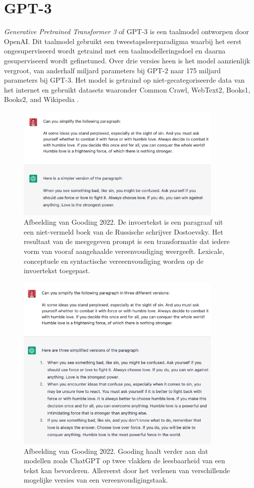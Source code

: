 \section{GPT-3}
\textit{Generative Pretrained Transformer 3} of GPT-3 is een taalmodel ontworpen door OpenAI. Dit taalmodel gebruikt een tweestapsleerparadigma waarbij het eerst ongesuperviseerd wordt getraind met een taalmodelleringsdoel en daarna gesuperviseerd wordt gefinetuned. Over drie versies heen is het model aanzienlijk vergroot, van anderhalf miljard parameters bij GPT-2 naar 175 miljard parameters bij GPT-3. Het model is getraind op niet-gecategoriseerde data van het internet en gebruikt datasets waaronder Common Crawl, WebText2, Books1, Books2, and Wikipedia \autocite{Radford2019, Li2022}.

\begin{figure}[H]
	\includegraphics[width=10cm]{img/chatgpt-example-simplification-gooding.png}
	\caption{Afbeelding van Gooding 2022. De invoertekst is een paragraaf uit een niet-vermeld boek van de Russische schrijver Dostoevsky. Het resultaat van de meegegeven prompt is een transformatie dat iedere vorm van vooraf aangehaalde vereenvoudiging weergeeft. Lexicale, conceptuele en syntactische vereeenvoudiging worden op de invoertekst toegepast.}
\end{figure}

\begin{figure}[H]
	\includegraphics[width=10cm]{img/chatgpt-example-different-versions-gooding.png}
	\caption{Afbeelding van Gooding 2022. Gooding haalt verder aan dat modellen zoals ChatGPT op twee vlakken de leesbaarheid van een tekst kan bevorderen. Allereerst door het verlenen van verschillende mogelijke versies van een vereenvoudigingstaak.}
\end{figure}

